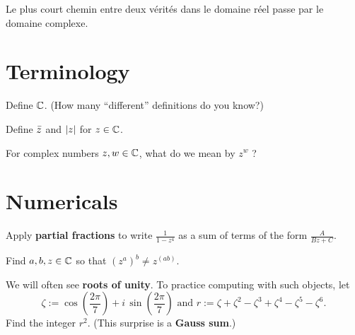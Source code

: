 \documentclass{homework}
\author{Jim Fowler}
\begin{document}
\maketitle

\begin{inspiration}
Le plus court chemin entre deux v\'erit\'es dans le domaine r\'eel passe par le domaine complexe.
\end{inspiration}

\section{Terminology}

\begin{problem}
  Define $\mathbb{C}$.  (How many ``different'' definitions do you know?)
\end{problem}

\begin{problem}
  Define $\bar{z}$ and $\left|z\right|$ for $z \in \mathbb{C}$.
\end{problem}

\begin{problem}
  For complex numbers $z, w \in \mathbb{C}$, what do we mean by $z^w$ ?
\end{problem}

\section{Numericals}

\begin{problem}
  Apply \textbf{partial fractions} to write $\displaystyle\frac{1}{1-z^4}$ as a sum of terms of the form $\displaystyle\frac{A}{Bz + C}$.
\end{problem}

\begin{problem}
  Find $a, b, z \in \mathbb{C}$ so that $\left(z^a\right)^b \neq z^{\left(ab\right)}$.
\end{problem}

\begin{problem}
  We will often see \textbf{roots of unity}.  To practice computing with such objects, let
  \[
    \zeta := \cos \left( \frac{2\pi}{7} \right) + i \, \sin \left( \frac{2\pi}{7} \right) \mbox{ and }
    r := \zeta + \zeta^2 - \zeta^3 + \zeta^4 - \zeta^5 - \zeta^6.
  \]
  Find the integer $r^2$.  (This surprise is a \textbf{Gauss sum}.)
\end{problem}
\end{document}
